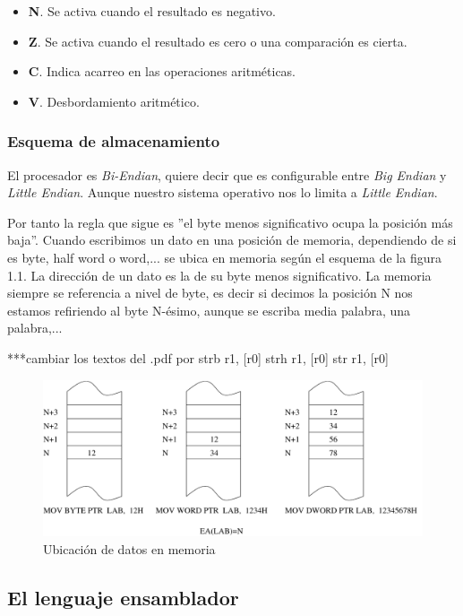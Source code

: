 \begin{descript}
    \begin{itemize}
      \item{\textbf{N}. Se activa cuando el resultado es negativo.}
      \item{\textbf{Z}. Se activa cuando el resultado es cero o una comparación es cierta.}
      \item{\textbf{C}. Indica acarreo en las operaciones aritméticas.}
      \item{\textbf{V}. Desbordamiento aritmético.}
    \end{itemize}
\end{descript}


\subsubsection{Esquema de almacenamiento}

El procesador es {\it Bi-Endian}, quiere decir que es configurable entre {\it Big Endian}
y {\it Little Endian}. Aunque nuestro sistema operativo nos lo limita a {\it Little Endian}.

Por tanto la regla que sigue es ''el byte menos significativo ocupa la posición más baja''.
Cuando escribimos un dato en una posición de memoria, dependiendo de si es byte, half word
o word,... se ubica en memoria según el esquema de la figura 1.1. La dirección de un dato
es la de su byte menos significativo. La memoria siempre se referencia a nivel de byte, es
decir si decimos la posición N nos estamos refiriendo al byte N-ésimo, aunque se escriba
media palabra, una palabra,...

***cambiar los textos del .pdf por strb r1, [r0]  strh r1, [r0]  str  r1, [r0]  
\begin{figure}[h]
  \centering
    \includegraphics[width=13cm]{graphs/memo.pdf}
  \caption{Ubicación de datos en memoria}
  \label{fig:memo}
\end{figure}

\subsection{El lenguaje ensamblador}


